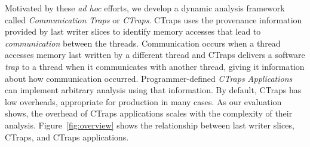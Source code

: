 \documentclass[10pt,nocopyrightspace]{sigplanconf}
\newcommand{\ctraps}{CTraps\xspace}
\begin{document}
Motivated by these {\em ad hoc} efforts, we develop a dynamic analysis
framework called {\em Communication Traps} or {\em \ctraps}.  \ctraps uses the
provenance information provided by last writer slices to identify memory
accesses that lead to {\em communication} between the threads. Communication
occurs when a thread accesses memory last written by a different thread and
\ctraps delivers a software {\em trap} to a thread when it communicates with
another thread, giving it information about how communication occurred.
Programmer-defined {\em \ctraps Applications} can implement arbitrary analysis
using that information. By default, \ctraps has low overheads, appropriate for
production in many cases.  As our evaluation shows, the overhead of \ctraps
applications scales with the complexity of their analysis.
Figure~\ref{fig:overview} shows the relationship between last writer
slices, \ctraps, and \ctraps applications.





%
\end{document}
